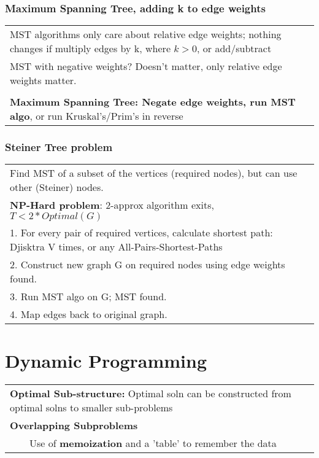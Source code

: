 \documentclass{article}
\newcommand{\tabitem}{~~\llap{\textbullet}~~}
\begin{document}
    \subsubsection{Maximum Spanning Tree, adding k to edge weights}

    \begin{tabular}{l}
        MST algorithms only care about relative edge weights; nothing changes if multiply edges by k, where $k > 0$, or add/subtract\\
        MST with negative weights? Doesn't matter, only relative edge weights matter.\\\\
        \textbf{Maximum Spanning Tree: Negate edge weights, run MST algo}, or run Kruskal's/Prim's in reverse\\
    \end{tabular}

    \subsubsection{Steiner Tree problem}

    \begin{tabular}{l}
        Find MST of a subset of the vertices (required nodes), but can use other (Steiner) nodes.\\
        \textbf{NP-Hard problem}: 2-approx algorithm exits, $T < 2 * Optimal(G)$\\
        1. For every pair of required vertices, calculate shortest path: Djisktra V times, or any All-Pairs-Shortest-Paths\\
        2. Construct new graph G on required nodes using edge weights found.\\
        3. Run MST algo on G; MST found.\\
        4. Map edges back to original graph.\\
    \end{tabular}


    \pagebreak

    \section{Dynamic Programming}

    \begin{tabular}{l}
        \textbf{Optimal Sub-structure: }Optimal soln can be constructed from optimal solns to smaller sub-problems\\
        \textbf{Overlapping Subproblems}\\
        \tabitem Use of \textbf{memoization} and a 'table' to remember the data\\
    \end{tabular}
\end{document}
